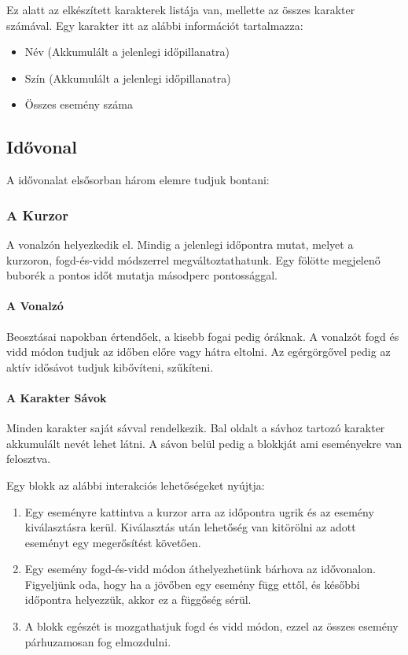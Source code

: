 Ez alatt az elkészített karakterek listája van, mellette az összes karakter számával. Egy karakter itt az alábbi információt tartalmazza:

\begin{itemize}
	\item Név (Akkumulált a jelenlegi időpillanatra)
	\item Szín (Akkumulált a jelenlegi időpillanatra)
	\item Összes esemény száma
\end{itemize}

\subsection{Idővonal} \label{section:ui-timeline}

A idővonalat elsősorban három elemre tudjuk bontani:

\subsubsection{A Kurzor}

A vonalzón helyezkedik el. Mindig a jelenlegi időpontra mutat, melyet a kurzoron, fogd-és-vidd módszerrel megváltoztathatunk. Egy fölötte megjelenő buborék a pontos időt mutatja másodperc pontossággal.

\paragraph{A Vonalzó}

Beosztásai napokban értendőek, a kisebb fogai pedig óráknak. A vonalzót fogd és vidd módon tudjuk az időben előre vagy hátra eltolni. Az egérgörgővel pedig az aktív idősávot tudjuk kibővíteni, szűkíteni.

\paragraph{A Karakter Sávok}

Minden karakter saját sávval rendelkezik. Bal oldalt a sávhoz tartozó karakter akkumulált nevét lehet látni. A sávon belül pedig a blokkját ami eseményekre van felosztva.

Egy blokk az alábbi interakciós lehetőségeket nyújtja:
\begin{enumerate}
	\item Egy eseményre kattintva a kurzor arra az időpontra ugrik és az esemény kiválasztásra kerül. Kiválasztás után lehetőség van kitörölni az adott eseményt egy megerősítést követően.
	\item Egy esemény fogd-és-vidd módon áthelyezhetünk bárhova az idővonalon. Figyeljünk oda, hogy ha a jövőben egy esemény függ ettől, és későbbi időpontra helyezzük, akkor ez a függőség sérül.
	\item A blokk egészét is mozgathatjuk fogd és vidd módon, ezzel az összes esemény párhuzamosan fog elmozdulni.
\end{enumerate}

